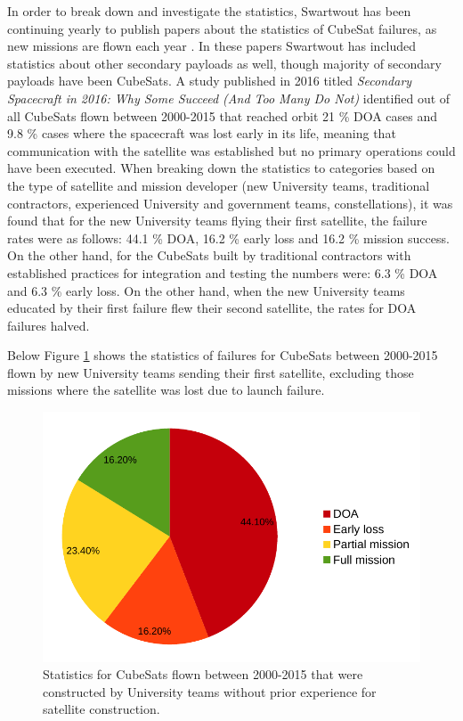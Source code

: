 \documentclass[english,12pt,a4paper,pdftex,elec,utf8]{aaltothesis}
\begin{document}
In order to break down and investigate the statistics, Swartwout has been continuing yearly to publish papers about the statistics of CubeSat failures, as new missions are flown each year \cite{Swart2016, Swart2015}. In these papers Swartwout has included statistics about other secondary payloads as well, though majority of secondary payloads have been CubeSats. A study published in 2016 titled \textit{Secondary Spacecraft in 2016:
Why Some Succeed (And Too Many Do Not)} identified out of all CubeSats flown between 2000-2015 that reached orbit 21 \% DOA cases and 9.8 \% cases where the spacecraft was lost early in its life, meaning that communication with the satellite was established but no primary operations could have been executed. When breaking down the statistics to categories based on the type of satellite and mission developer (new University teams, traditional contractors, experienced University and government teams, constellations), it was found that for the new University teams flying their first satellite, the failure rates were as follows: 44.1 \% DOA, 16.2 \% early loss and 16.2 \% mission success. On the other hand, for the CubeSats built by traditional contractors with established practices for integration and testing the numbers were: 6.3 \% DOA and 6.3 \% early loss. On the other hand, when the new University teams educated by their first failure flew their second satellite, the rates for DOA failures halved. \cite{Swart2016, Swart2015}\par 
Below Figure \ref{hobbyistflown2015pic} shows the statistics of failures for CubeSats between 2000-2015 flown by new University teams sending their first satellite, excluding those missions where the satellite was lost due to launch failure.\par 
\begin{figure}[h!]
\centering
\includegraphics[scale=0.5]{university2015}
%
\caption{Statistics for CubeSats flown between 2000-2015 that were constructed by University teams without prior experience for satellite construction. \cite{Swart2016}}
\label{hobbyistflown2015pic}
\end{figure} 
\end{document}
